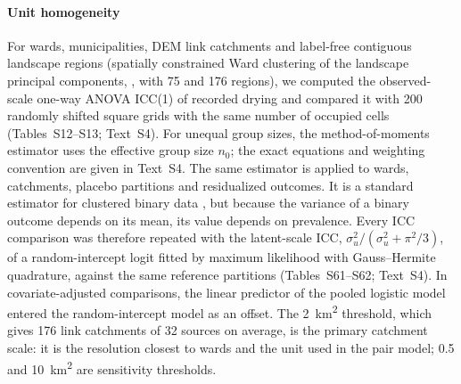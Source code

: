 \documentclass[preprint,12pt,authoryear]{elsarticle}
\begin{document}
\paragraph{Unit homogeneity} For wards, municipalities, DEM link catchments and label-free contiguous landscape regions (spatially constrained Ward clustering of the landscape principal components, \citealp{ward1963hierarchical}, with 75 and 176 regions), we computed the observed-scale one-way ANOVA ICC(1) of recorded drying and compared it with 200 randomly shifted square grids with the same number of occupied cells (Tables~S12--S13; Text~S4). For unequal group sizes, the method-of-moments estimator uses the effective group size $n_0$; the exact equations and weighting convention are given in Text~S4. The same estimator is applied to wards, catchments, placebo partitions and residualized outcomes. It is a standard estimator for clustered binary data \citep{ridout1999estimating}, but because the variance of a binary outcome depends on its mean, its value depends on prevalence. Every ICC comparison was therefore repeated with the latent-scale ICC, $\sigma_u^2/(\sigma_u^2+\pi^2/3)$, of a random-intercept logit fitted by maximum likelihood with Gauss--Hermite quadrature, against the same reference partitions (Tables~S61--S62; Text~S4). In covariate-adjusted comparisons, the linear predictor of the pooled logistic model entered the random-intercept model as an offset. The \SI{2}{\kilo\metre\squared} threshold, which gives 176 link catchments of 32 sources on average, is the primary catchment scale: it is the resolution closest to wards and the unit used in the pair model; 0.5 and \SI{10}{\kilo\metre\squared} are sensitivity thresholds.
\end{document}
